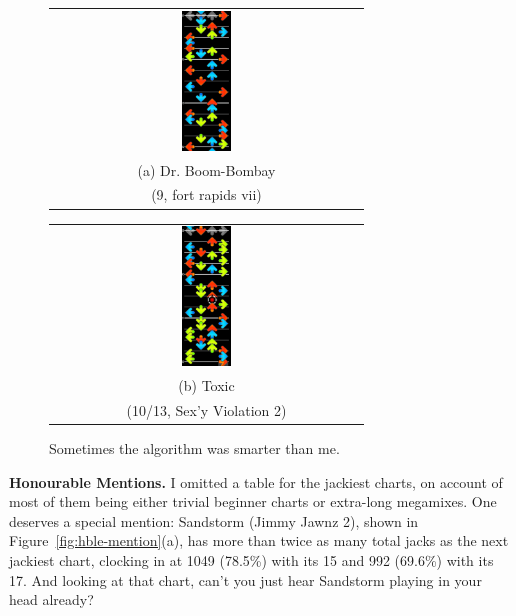 \documentclass[10pt]{sigplanconf}
\begin{document}
\begin{figure}[t]
	\begin{center}
	\begin{tabular}{c}
		\includegraphics[width=0.16\textwidth]{boom-bombay-double-sideswitch-instead-of-jack.png}
		\\
		(a) Dr. Boom-Bombay \\
		(9, fort rapids vii)
	\end{tabular}
	\begin{tabular}{c}
		\includegraphics[width=0.16\textwidth]{toxic-xoverfs-avoid-doublestep.png}
		\\
		(b) Toxic \\
		(10/13, Sex'y Violation 2)
	\end{tabular}
	\end{center}
	\caption{Sometimes the algorithm was smarter than me.}
	\label{fig:surprise-sideswitch}
\end{figure}

{\bf Honourable Mentions.}
I omitted a table for the jackiest charts,
on account of most of them being either trivial beginner charts or extra-long megamixes.
One deserves a special mention:
Sandstorm (Jimmy Jawnz 2), shown in Figure~\ref{fig:hble-mention}(a),
has more than twice as many total jacks as the next jackiest chart,
clocking in at 1049 (78.5\%) with its 15 and 992 (69.6\%) with its 17.
And looking at that chart, can't you just hear Sandstorm playing in your head already?
\end{document}

